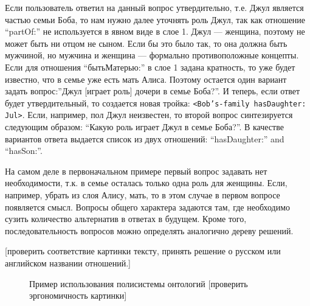 \documentclass[utf8]{../IncArticle}
\newcommand{\e}[2][fcolor]{\textcolor{pcolor}{[}\textcolor{#1}{#2}\textcolor{pcolor}{]}}
\begin{document}
Если пользователь ответил на данный вопрос утвердительно, т.е. Джул
является частью семьи Боба, то нам нужно далее уточнять роль Джул, так
как отношение ``partOf:'' не используется в явном виде в слое 1.  Джул
--- женщина, поэтому не может быть ни отцом не сыном. Если бы это было
так, то она должна быть мужчиной, но мужчина и женщина --- формально
противоположные концепты.  Если для отношения ``бытьМатерью:'' в слое
1 задана кратность, то уже будет известно, что в семье уже есть мать
Алиса.  Поэтому остается один вариант задать вопрос:''Джул [играет
роль] дочери в семье Боба?''.  И теперь, если ответ будет
утвердительный, то создается новая тройка: \texttt{<Bob's-family
  hasDaughter: Jul>}. Если, например, пол Джул неизвестен, то второй
вопрос синтезируется следующим образом: ``Какую роль играет Джул в
семье Боба?''.  В качестве вариантов ответа выдается список из двух
отношений: ``hasDaughter:'' and ``hasSon:''.

На самом деле в первоначальном примере первый вопрос задавать нет
необходимости, т.к. в семье осталась только одна роль для женщины.
Если, например, убрать из слоя Алису, мать, то в этом случае в первом
вопросе появляется смысл.  Вопросы общего характера задаются там, где
необходимо сузить количество альтернатив в ответах в будущем.  Кроме
того, последовательность вопросов можно определять аналогично дереву
решений.

\e{проверить соответствие картинки тексту, принять решение о русском
  или английском названии отношений.}

\begin{figure}
\begin{center}
\sf
\def\svgwidth{0.7\linewidth}

\end{center}
\caption{Пример использования полисистемы онтологий \e{проверить
    эргономичность картинки}}
\label{OPSA}
\end{figure}









\end{document}

